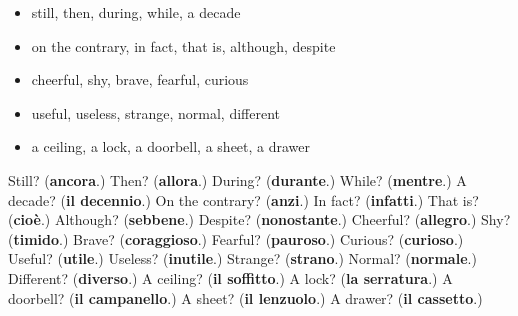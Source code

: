 \begin{itemize}
\raggedright
  \item still, then, during, while, a decade
  \item on the contrary, in fact, that is, although, despite
  \item cheerful, shy, brave, fearful, curious
  \item useful, useless, strange, normal, different
  \item a ceiling, a lock, a doorbell, a sheet, a drawer
\end{itemize}

\begin{tcolorbox}[breakable,colback=teal!4,colframe=teal!35!black,title={Before you move on}]
Still? (\textbf{ancora}.) Then? (\textbf{allora}.) During? (\textbf{durante}.) While? (\textbf{mentre}.) A decade? (\textbf{il decennio}.) On the contrary? (\textbf{anzi}.) In fact? (\textbf{infatti}.) That is? (\textbf{cioè}.) Although? (\textbf{sebbene}.) Despite? (\textbf{nonostante}.) Cheerful? (\textbf{allegro}.) Shy? (\textbf{timido}.) Brave? (\textbf{coraggioso}.) Fearful? (\textbf{pauroso}.) Curious? (\textbf{curioso}.) Useful? (\textbf{utile}.) Useless? (\textbf{inutile}.) Strange? (\textbf{strano}.) Normal? (\textbf{normale}.) Different? (\textbf{diverso}.) A ceiling? (\textbf{il soffitto}.) A lock? (\textbf{la serratura}.) A doorbell? (\textbf{il campanello}.) A sheet? (\textbf{il lenzuolo}.) A drawer? (\textbf{il cassetto}.)
\end{tcolorbox}
